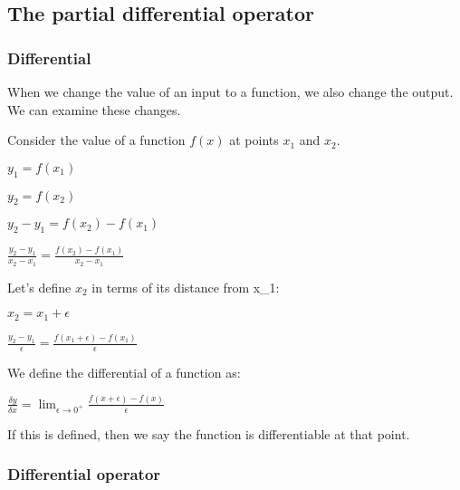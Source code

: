 
\subsection{The partial differential operator}

\subsubsection{Differential}

When we change the value of an input to a function, we also change the output. We can examine these changes.

Consider the value of a function \(f(x)\) at points \(x_1\) and \(x_2\).

\(y_1=f(x_1)\)

\(y_2=f(x_2)\)

\(y_2-y_1=f(x_2)-f(x_1)\)

\(\frac{y_2-y_1}{x_2-x_1}=\frac{f(x_2)-f(x_1)}{x_2-x_1}\)

Let's define \(x_2\) in terms of its distance from x_1:

\(x_2=x_1+\epsilon\)

\(\frac{y_2-y_1}{\epsilon }=\frac{f(x_1+\epsilon )-f(x_1)}{\epsilon }\)

We define the differential of a function as:

\(\frac{\delta y}{\delta x}=\lim_{\epsilon \rightarrow 0^+}\frac{f(x+\epsilon )-f(x)}{\epsilon }\)

If this is defined, then we say the function is differentiable at that point.

\subsubsection{Differential operator}

